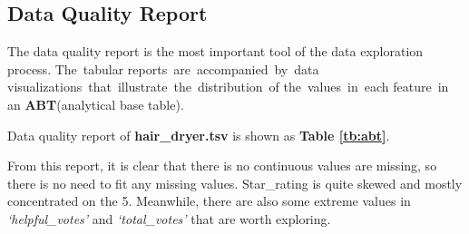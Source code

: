 \documentclass[12pt]{article}  %
\begin{document}
\subsection{Data Quality Report}
The data quality report is the most important tool of the data exploration process. The tabular reports are accompanied by data visualizations that illustrate the distribution of the values in each feature in an \textbf{ABT}(analytical base table)\cite{kelleher2015fundamentals}.

Data quality report of \textbf{hair\_dryer.tsv} is shown as \textbf{Table \ref{tb:abt}}.
\begin{table}[!htbp]
	\begin{center}
		\caption{Analytical Base Table}\label{tb:abt}
		 \begin{threeparttable}      
		\end{threeparttable}       %
	\end{center}
\end{table}


From this report, it is clear that there is no continuous values are missing, so there is no need to fit any missing values. Star\_rating is quite skewed and mostly concentrated on the 5. Meanwhile, there are also some extreme values in \textsl{`helpful\_votes'} and \textsl{`total\_votes'} that are worth exploring.
\end{document}
